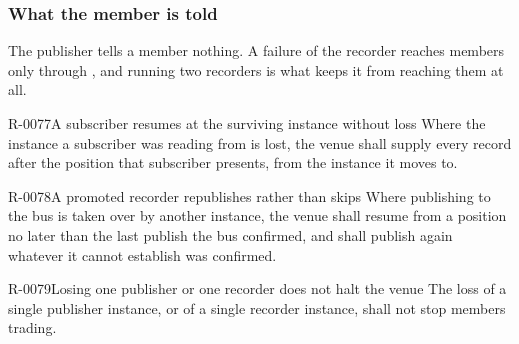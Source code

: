 \subsubsection{What the member is told}
\label{sec:ha:enabled:publishing:member}

The publisher tells a member nothing. A failure of the recorder reaches members
only through , and running two recorders is what keeps it from
reaching them at all.

\begin{requirement}{R-0077}{A subscriber resumes at the surviving instance without loss}
  Where the instance a subscriber was reading from is lost, the venue shall
  supply every record after the position that subscriber presents, from the
  instance it moves to.
\end{requirement}

\begin{requirement}{R-0078}{A promoted recorder republishes rather than skips}
  Where publishing to the bus is taken over by another instance, the venue shall
  resume from a position no later than the last publish the bus confirmed, and
  shall publish again whatever it cannot establish was confirmed.
\end{requirement}

\begin{requirement}{R-0079}{Losing one publisher or one recorder does not halt the venue}
  The loss of a single publisher instance, or of a single recorder instance,
  shall not stop members trading.
\end{requirement}
